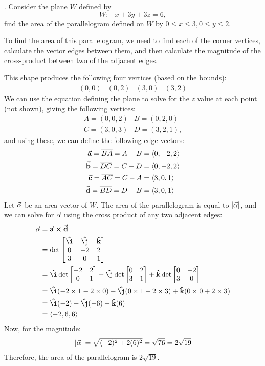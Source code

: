 \documentclass{report}
\newcounter{problemctr}
\newcounter{subproblemctr}[problemctr]
\newcommand{\problem}[1]{%
  \stepcounter{problemctr}%
  \setcounter{subproblemctr}{0}%
  \noindent\arabic{problemctr}. #1\par
}
\newenvironment{answer}
{\begin{minipage}{\linewidth}}
{\end{minipage}}
\newcommand{\crosstable}[6]{
\begin{bmatrix}
\vu{\i} & \vu{\j} & \vu{k} \\
#1 & #2 & #3 \\
#4 & #5 & #6
\end{bmatrix}
}
\newcommand{\mat}[4]{
\begin{bmatrix}
#1 & #2 \\
#3 & #4
\end{bmatrix}
}
\begin{document}
\problem{Consider the plane $W$ defined by $$W: -x + 3y + 3z = 6,$$ find the area of the parallelogram defined on $W$ by $0 \le x \le 3, 0 \le y \le 2$.}
\begin{answer}
To find the area of this parallelogram, we need to find each of the corner vertices, calculate the vector edges between them, and then calculate the magnitude of the cross-product between two of the adjacent edges.

This shape produces the following four vertices (based on the bounds):
\begin{equation*}
\begin{matrix}
(0,0) & (0,2) & (3,0) & (3,2)
\end{matrix}
\end{equation*}
We can use the equation defining the plane to solve for the $z$ value at each point (not shown), giving the following vertices:
\begin{equation*}
\begin{matrix}
A=(0,0,2) & B=(0,2,0) \\
C=(3,0,3) & D=(3,2,1),
\end{matrix}
\end{equation*}
and using these, we can define the following edge vectors:
\begin{align*}
\va{a} = \overline{BA} = A - B &= \langle 0, -2, 2 \rangle \\
\va{b} = \overline{DC} = C - D &= \langle 0, -2, 2 \rangle \\
\va{c} = \overline{AC} = C - A &= \langle 3,  0, 1 \rangle \\
\va{d} = \overline{BD} = D - B &= \langle 3,  0, 1 \rangle
\end{align*}
Let $\va{\alpha}$ be an area vector of $W$. The area of the parallelogram is equal to $|\va{\alpha}|$, and we can solve for $\va{\alpha}$ using the cross product of any two adjacent edges:
\begin{align*}
\va{\alpha} 
&= \va{a} \cross \va{d} \\
&= \det\crosstable{0}{-2}{2}{3}{0}{1} \\
&= \vu{\i}\det\mat{-2}{2}{0}{1} - \vu{\j}\det\mat{0}{2}{3}{1} + \vu{k}\det\mat{0}{-2}{3}{0} \\
&= \vu{\i} (-2 \times 1 - 2 \times 0) - \vu{\j} (0 \times 1 - 2 \times 3) + \vu{k} (0 \times 0 + 2 \times 3) \\
&= \vu{\i} (-2) -\vu{\j} (-6) + \vu{k}(6) \\
&= \langle -2, 6, 6 \rangle
\end{align*}
Now, for the magnitude:
\begin{align*}
|\va{\alpha}| = \sqrt{(-2)^2 + 2(6)^2} = \sqrt{76} = 2\sqrt{19}
\end{align*}
Therefore, the area of the parallelogram is $2\sqrt{19}$.
\end{answer}
\end{document}
